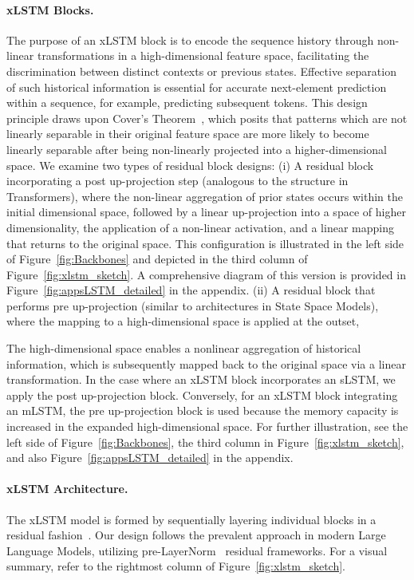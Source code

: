 \paragraph{xLSTM Blocks.}
\label{sec:xLSTMblock}
The purpose of an xLSTM block is to encode the sequence history through non-linear transformations in a high-dimensional feature space, facilitating the discrimination between distinct contexts or previous states. Effective separation of such historical information is essential for accurate next-element prediction within a sequence, for example, predicting subsequent tokens. This design principle draws upon Cover’s Theorem~\citep{Cover:65}, which posits that patterns which are not linearly separable in their original feature space are more likely to become linearly separable after being non-linearly projected into a higher-dimensional space. We examine two types of residual block designs: (i) A residual block incorporating a post up-projection step (analogous to the structure in Transformers), where the non-linear aggregation of prior states occurs within the initial dimensional space, followed by a linear up-projection into a space of higher dimensionality, the application of a non-linear activation, and a linear mapping that returns to the original space. This configuration is illustrated in the left side of Figure~\ref{fig:Backbones}
and depicted in the third column of Figure~\ref{fig:xlstm_sketch}. A comprehensive diagram of this version is provided in Figure~\ref{fig:appsLSTM_detailed} in the appendix. (ii) A residual block that performs pre up-projection (similar to architectures in State Space Models), where the mapping to a high-dimensional space is applied at the outset,

The high-dimensional space enables a nonlinear aggregation of historical information, which is subsequently mapped back to the original space via a linear transformation. In the case where an xLSTM block incorporates an sLSTM, we apply the post up-projection block. Conversely, for an xLSTM block integrating an mLSTM, the pre up-projection block is used because the memory capacity is increased in the expanded high-dimensional space. For further illustration, see the left side of Figure~\ref{fig:Backbones}, the third column in Figure~\ref{fig:xlstm_sketch}, and also Figure~\ref{fig:appsLSTM_detailed} in the appendix.

\paragraph{xLSTM Architecture. }
\label{sec:xLSTMarchitecure}
The xLSTM model is formed by sequentially layering individual blocks in a residual fashion~\citep{Srivastava:15,He:16}. Our design follows the prevalent approach in modern Large Language Models, utilizing pre-LayerNorm~\citep{Ba:16b} residual frameworks. For a visual summary, refer to the rightmost column of Figure~\ref{fig:xlstm_sketch}.

